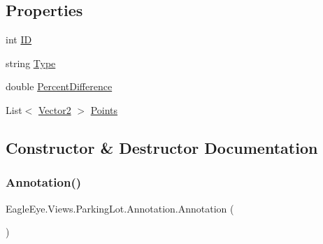 \subsection*{Properties}
\begin{DoxyCompactItemize}
\item 
int \mbox{\hyperlink{class_eagle_eye_1_1_views_1_1_parking_lot_1_1_annotation_a2030e36f1aaa354132b808601261ca59}{ID}}
\item 
string \mbox{\hyperlink{class_eagle_eye_1_1_views_1_1_parking_lot_1_1_annotation_a90963e9e05db4da561e03dcea8cf1c8e}{Type}}
\item 
double \mbox{\hyperlink{class_eagle_eye_1_1_views_1_1_parking_lot_1_1_annotation_ac5253d379e1c453fd5344d63624fc4ed}{Percent\+Difference}}
\item 
List$<$ \mbox{\hyperlink{class_eagle_eye_1_1_views_1_1_parking_lot_1_1_vector2}{Vector2}} $>$ \mbox{\hyperlink{class_eagle_eye_1_1_views_1_1_parking_lot_1_1_annotation_a7f931393cb52e90a6eca3ceb7ba8dad9}{Points}}
\end{DoxyCompactItemize}


\subsection{Constructor \& Destructor Documentation}
\mbox{\label{class_eagle_eye_1_1_views_1_1_parking_lot_1_1_annotation_a219a85017ab1fb54045c686bd49e2e32}} 
\subsubsection{\texorpdfstring{Annotation()}{Annotation()}\hspace{0.1cm}{\footnotesize\ttfamily [1/2]}}
{\footnotesize\ttfamily Eagle\+Eye.\+Views.\+Parking\+Lot.\+Annotation.\+Annotation (\begin{DoxyParamCaption}{ }\end{DoxyParamCaption})}

